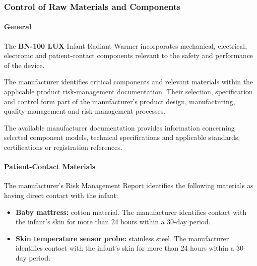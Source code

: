 ﻿

\hypertarget{p3-2-2-3}{}

\subsubsection{Control of Raw Materials and Components}

\paragraph{General}

The \textbf{BN-100 LUX} Infant Radiant Warmer incorporates
mechanical, electrical, electronic and patient-contact components
relevant to the safety and performance of the device.

The manufacturer identifies critical components and relevant
materials within the applicable product risk-management
documentation. Their selection, specification and control form
part of the manufacturer's product design, manufacturing,
quality-management and risk-management processes.

The available manufacturer documentation provides information
concerning selected component models, technical specifications
and applicable standards, certifications or registration references.


\paragraph{Patient-Contact Materials}

The manufacturer's Risk Management Report identifies the following
materials as having direct contact with the infant:

\begin{itemize}
    \item \textbf{Baby mattress:} cotton material. The manufacturer
    identifies contact with the infant's skin for more than
    24 hours within a 30-day period.

    \item \textbf{Skin temperature sensor probe:} stainless steel.
    The manufacturer identifies contact with the infant's skin
    for more than 24 hours within a 30-day period.
\end{itemize}

